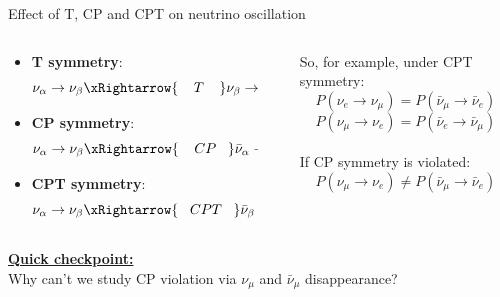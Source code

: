 \begin{frame}{Effect of T, CP and CPT on neutrino oscillation}

\begin{columns}[T]
 \begin{column}{0.45\textwidth}
 \begin{block}{}
 \begin{itemize}
 \item {\bf T symmetry}:
 \begin{equation*}
   \nu_{\alpha} \rightarrow \nu_{\beta}
   \xRightarrow{\;\;\;\;T\;\;\;\;}
   \nu_{\beta} \rightarrow \nu_{\alpha}
 \end{equation*}
 \item {\bf CP symmetry}:
 \begin{equation*}
   \nu_{\alpha} \rightarrow \nu_{\beta}
   \xRightarrow{\;\;\;\;CP\;\;\;}
   \bar{\nu}_{\alpha} \rightarrow \bar{\nu}_{\beta}
 \end{equation*}
 \item {\bf CPT symmetry}:
 \begin{equation*}
   \nu_{\alpha} \rightarrow \nu_{\beta}
   \xRightarrow{\;\;\;CPT\;\;\;}
   \bar{\nu}_{\beta} \rightarrow \bar{\nu}_{\alpha}
 \end{equation*}
 \end{itemize}
 \end{block}
\end{column}
\begin{column}{0.02\textwidth}
\end{column}
\begin{column}{0.53\textwidth}
\vspace{0.3cm}
So, for example, under CPT symmetry:
\begin{equation*}
  P(\nu_{e} \rightarrow \nu_{\mu}) =
  P(\bar{\nu}_{\mu} \rightarrow \bar{\nu}_{e})
\end{equation*}
\begin{equation*}
  P(\nu_{\mu} \rightarrow \nu_{e}) =
  P(\bar{\nu}_{e} \rightarrow \bar{\nu}_{\mu})
\end{equation*}\\
\vspace{0.3cm}
If CP symmetry is violated:
\begin{equation*}
  P(\nu_{\mu} \rightarrow \nu_{e}) \ne
  P(\bar{\nu}_{\mu} \rightarrow \bar{\nu}_{e})
\end{equation*}
\end{column}
\end{columns}

\vspace{0.3cm}

{\color{capri}
\underline{\bf Quick checkpoint:}\\
Why can't we study CP violation via
$\nu_{\mu}$ and $\bar{\nu}_{\mu}$ disappearance?
}

\end{frame}

